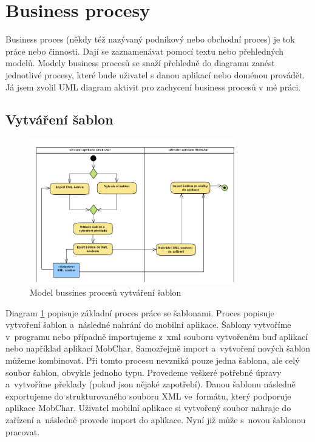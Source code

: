 \documentclass[thesis=B,czech]{resources/FITthesis}[2012/06/26]
\begin{document}
	\section{Business procesy}
Business proces (někdy též nazývaný podnikový nebo obchodní proces) je tok práce nebo činnosti. Dají se zaznamenávat pomocí textu nebo přehledných modelů. Modely business procesů se snaží přehledně do diagramu zanést jednotlivé procesy, které bude uživatel s danou aplikací nebo doménou provádět. Já jsem zvolil UML diagram aktivit pro zachycení business procesů v mé práci.
\subsection{Vytváření šablon} \label{sec:vytvareni_sablon}
\begin{figure}\centering
	\includegraphics[width=0.8\textwidth]{images/bussiness_sablony}
	\caption[Business proces vytváření šablon]{Model bussines procesů vytváření šablon}\label{fig:bp_sablony}
\end{figure}
Diagram \ref{fig:bp_sablony} popisuje základní proces práce se šablonami. Proces popisuje vytvoření šablon a~následné nahrání do mobilní aplikace. Šablony vytvoříme v~programu nebo případně importujeme z~xml souboru vytvořeném buď aplikací nebo například aplikací MobChar. Samozřejmě import a~vytvoření nových šablon můžeme kombinovat. Při tomto procesu nevzniká pouze jedna šablona, ale celý soubor šablon, obvykle jednoho typu. Provedeme veškeré potřebné úpravy a~vytvoříme překlady (pokud jsou nějaké zapotřebí). Danou šablonu následně exportujeme do strukturovaného souboru XML ve~formátu, který podporuje aplikace MobChar. Uživatel mobilní aplikace si vytvořený soubor nahraje do zařízení a~následně provede import do aplikace. Nyní již může s~novou šablonou pracovat.
\end{document}
